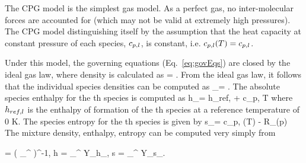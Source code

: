 The CPG model is the simplest gas model. As a perfect gas, no inter-molecular forces are accounted for (which may not be valid at extremely high pressures). The CPG model distinguishing itself by the assumption that the heat capacity at constant pressure of each species, $c_{p,l}$, is constant, i.e. $c_{p,l}(T) = c_{p,l}$.

Under this model, the governing equations (Eq.~\ref{eq:govEqs}) are closed by the ideal gas law, where density is calculated as
\be
    \rho = .
\ee
From the ideal gas law, it follows that the individual species densities can be computed as
\be
    \rho_\speciesIdx = \rho {}.
\ee
The absolute species enthalpy for the \speciesIdx th species is computed as
\be
    h_\speciesIdx = h_{ref,\speciesIdx} + c_{p,\speciesIdx} T
\ee
where $h_{ref,l}$ is the enthalpy of formation of the \speciesIdx th species at a reference temperature of 0 K. The species entropy for the \speciesIdx th species is given by
\be
    s_\speciesIdx = c_{p,\speciesIdx} (T) - R_\speciesIdx {}(p)
\ee
The mixture density, enthalpy, entropy can be computed very simply from

\be
    \rho = \left( \sum_{}^{\numSpecies}  \right)^{-1}, \quad h = \sum_{}^{\numSpecies} Y_\speciesIdx h_\speciesIdx, \quad s = \sum_{}^{\numSpecies} Y_\speciesIdx s_\speciesIdx.
\ee

